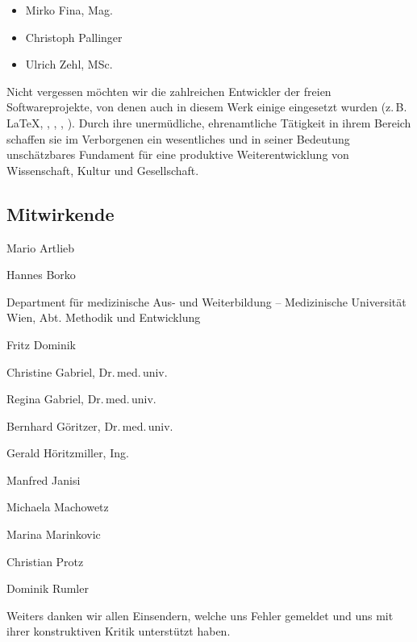 \begin{raggedright}
\begin{itemize}\CorrectionListsBox
  \item Mirko Fina, Mag.
  \item Christoph Pallinger
  \item Ulrich Zehl, MSc.
\end{itemize}
\bigskip

Nicht vergessen möchten wir die zahlreichen
Entwickler der freien Softwareprojekte, von denen auch in
diesem Werk einige eingesetzt wurden (z.\,B. \LaTeX,
, , , ). Durch ihre unermüdliche, ehrenamtliche Tätigkeit in ihrem Bereich schaffen sie im
Verborgenen ein wesentliches und in seiner
Bedeutung unschätzbares Fundament für eine
produktive Weiterentwicklung von Wissenschaft, Kultur und Gesellschaft.




\subsection*{Mitwirkende}



\begin{compactitem}
  \item Mario Artlieb
  \item Hannes Borko
  \item Department für medizinische Aus- und Weiterbildung -- Medizinische
  Universität Wien, Abt. Methodik und Entwicklung
  \item Fritz Dominik
  \item Christine Gabriel, Dr.\,med.\,univ.
  \item Regina Gabriel, Dr.\,med.\,univ.
  \item Bernhard Göritzer, Dr.\,med.\,univ.
  \item Gerald Höritzmiller, Ing.
  \item Manfred Janisi
  \item Michaela Machowetz
  \item Marina Marinkovic
  \item Christian Protz
  \item Dominik Rumler
\end{compactitem}

\bigskip

Weiters danken wir allen Einsendern, welche uns Fehler gemeldet und
uns mit ihrer konstruktiven Kritik unterstützt haben.


\end{raggedright}




